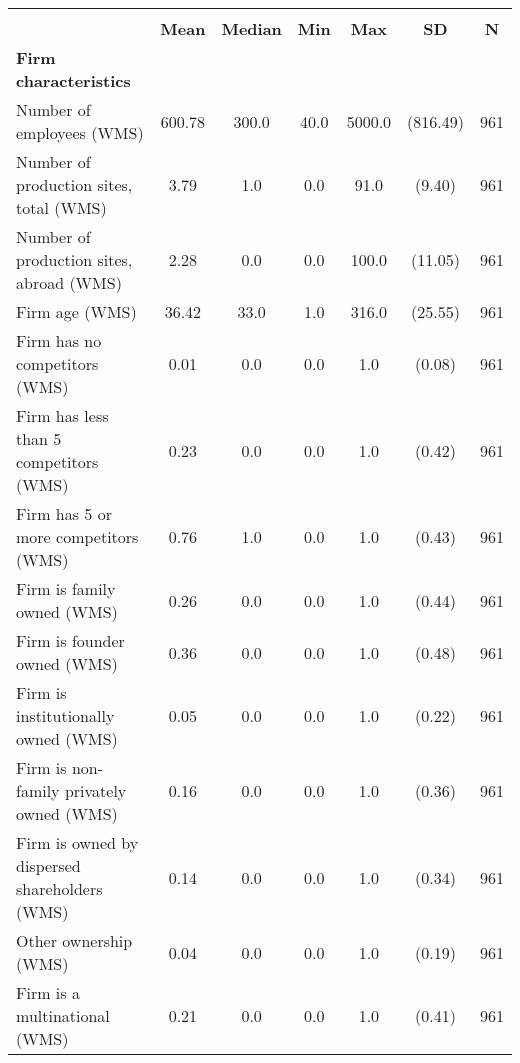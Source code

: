 {
\def\sym#1{\ifmmode^{#1}\else\(^{#1}\)\fi}
\begin{tabular}{l*{1}{cccccc}}
\toprule
                    &\multicolumn{6}{c}{}                                                         \\
                    &\textbf{Mean}&\textbf{Median}&\textbf{Min}&\textbf{Max}& \textbf{SD}&  \textbf{N}\\
\midrule
\textbf{Firm characteristics}&            &            &            &            &            &            \\
Number of employees (WMS)&      600.78&       300.0&        40.0&      5000.0&    (816.49)&         961\\
Number of production sites, total (WMS)&        3.79&         1.0&         0.0&        91.0&      (9.40)&         961\\
Number of production sites, abroad (WMS)&        2.28&         0.0&         0.0&       100.0&     (11.05)&         961\\
Firm age (WMS)      &       36.42&        33.0&         1.0&       316.0&     (25.55)&         961\\
Firm has no competitors (WMS)&        0.01&         0.0&         0.0&         1.0&      (0.08)&         961\\
Firm has less than 5 competitors (WMS)&        0.23&         0.0&         0.0&         1.0&      (0.42)&         961\\
Firm has 5 or more competitors (WMS)&        0.76&         1.0&         0.0&         1.0&      (0.43)&         961\\
Firm is family owned (WMS)&        0.26&         0.0&         0.0&         1.0&      (0.44)&         961\\
Firm is founder owned (WMS)&        0.36&         0.0&         0.0&         1.0&      (0.48)&         961\\
Firm is institutionally owned (WMS)&        0.05&         0.0&         0.0&         1.0&      (0.22)&         961\\
Firm is non-family privately owned (WMS)&        0.16&         0.0&         0.0&         1.0&      (0.36)&         961\\
Firm is owned by dispersed shareholders (WMS)&        0.14&         0.0&         0.0&         1.0&      (0.34)&         961\\
Other ownership (WMS)&        0.04&         0.0&         0.0&         1.0&      (0.19)&         961\\
Firm is a multinational (WMS)&        0.21&         0.0&         0.0&         1.0&      (0.41)&         961\\

\end{tabular}}
